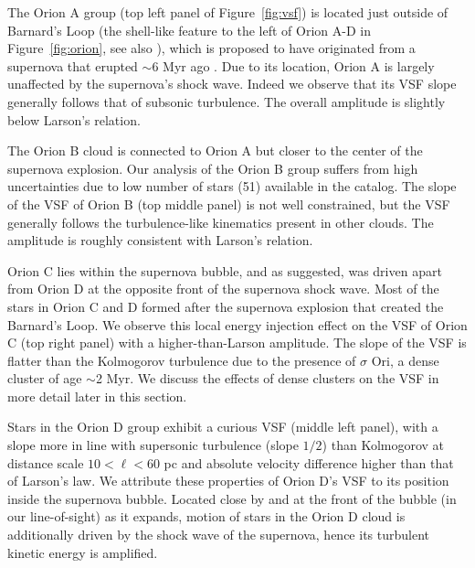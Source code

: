 The Orion A group (top left panel of Figure~\ref{fig:vsf}) is located just outside of Barnard's Loop (the shell-like feature to the left of Orion A-D in Figure~\ref{fig:orion}, see also \citet{ochsendorf_nested_2015}), which is proposed to have originated from a supernova that erupted $\sim$6 Myr ago \citep{kounkel_supernovae_2020}. Due to its location, Orion A is largely unaffected by the supernova's shock wave. Indeed we observe that its VSF slope generally follows that of subsonic turbulence. The overall amplitude is slightly below Larson's relation. 

The Orion B cloud is connected to Orion A but closer to the center of the supernova explosion. Our analysis of the Orion B group suffers from high uncertainties due to low number of stars (51) available in the catalog. The slope of the VSF of Orion B (top middle panel) is not well constrained, but the VSF generally follows the turbulence-like kinematics present in other clouds. The amplitude is roughly consistent with Larson's relation.

Orion C lies within the supernova bubble, and as \citet{kounkel_supernovae_2020} suggested, was driven apart from Orion D at the opposite front of the supernova shock wave. Most of the stars in Orion C and D formed after the supernova explosion that created the Barnard's Loop. We observe this local energy injection effect on the VSF of Orion C (top right panel) with a higher-than-Larson amplitude. 
The slope of the VSF is flatter than the Kolmogorov turbulence due to the presence of $\sigma$ Ori, a dense cluster of age $\sim$2 Myr. We discuss the effects of dense clusters on the VSF in more detail later in this section. 

Stars in the Orion D group exhibit a curious VSF (middle left panel), with a slope more in line with supersonic turbulence (slope $1/2$) than Kolmogorov at distance scale $10<\ell<60$ pc and absolute velocity difference higher than that of Larson's law. We attribute these properties of Orion D's VSF to its position inside the supernova bubble. Located close by and at the front of the bubble (in our line-of-sight) as it expands, motion of stars in the Orion D cloud is additionally driven by the shock wave of the supernova, hence its turbulent kinetic energy is amplified. 


